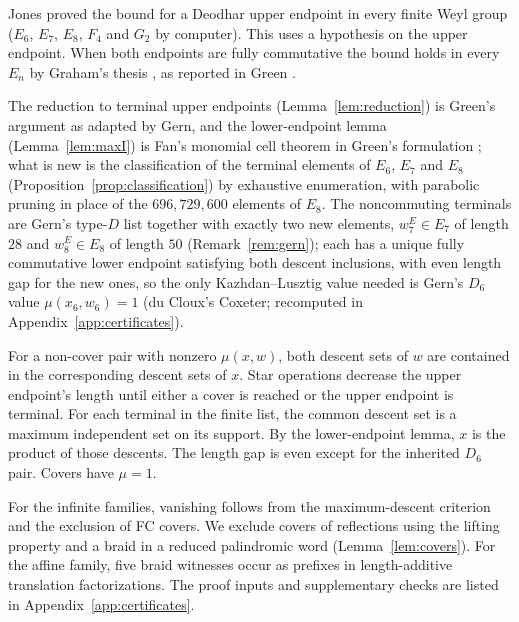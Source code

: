 \documentclass[10pt]{article}
\theoremstyle{remark}
\begin{document}
Jones \cite[Theorems~1.2 and~6.1]{Jones}
proved the bound for a Deodhar upper endpoint in every finite Weyl group
($E_6$, $E_7$, $E_8$, $F_4$ and $G_2$ by computer). This uses a
hypothesis on the upper endpoint. When both endpoints are fully
commutative the bound holds in every $E_n$ by
Graham's thesis \cite{Graham}, as reported in
Green \cite[Remark~9.5]{GreenEn}.

The reduction to terminal upper endpoints
(Lemma~\ref{lem:reduction}) is Green's argument as adapted by Gern, and
the lower-endpoint lemma (Lemma~\ref{lem:maxI}) is Fan's monomial cell
theorem \cite{Fan} in Green's formulation \cite{GreenEn}; what is new is
the classification of the terminal elements of $E_6$, $E_7$ and $E_8$
(Proposition~\ref{prop:classification}) by exhaustive enumeration, with
parabolic pruning in place of the $696{,}729{,}600$ elements of $E_8$. The
noncommuting terminals are Gern's type-$D$ list together with
exactly two new elements, $w_7^{E}\in E_7$ of length $28$ and $w_8^{E}\in E_8$ of
length $50$ (Remark~\ref{rem:gern}); each has a unique fully commutative
lower endpoint satisfying both descent inclusions, with even length gap
for the new ones, so the only Kazhdan--Lusztig value needed is Gern's $D_6$
value $\mu(x_6,w_6)=1$ \cite[Lemma~4.5.5]{Gern} (du Cloux's
\textsf{Coxeter}; recomputed in Appendix~\ref{app:certificates}).

For a non-cover pair with nonzero $\mu(x,w)$, both descent sets of $w$
are contained in the corresponding descent sets of $x$.
Star operations decrease the upper endpoint's length until either a
cover is reached or the upper endpoint is terminal.
For each terminal in the finite list, the common descent set is a
maximum independent set on its support. By the lower-endpoint lemma,
$x$ is the product of those descents. The length gap is even except for
the inherited $D_6$ pair. Covers have $\mu=1$.

For the infinite families, vanishing follows from the maximum-descent
criterion and the exclusion of FC covers. We exclude covers of reflections
using the lifting property and a braid in a reduced palindromic word
(Lemma~\ref{lem:covers}). For the affine family, five braid witnesses occur
as prefixes in length-additive translation factorizations. The proof
inputs and supplementary checks are listed in
Appendix~\ref{app:certificates}.
\end{document}
